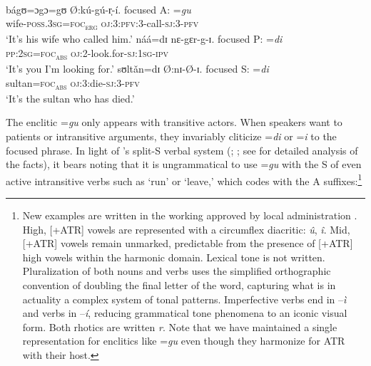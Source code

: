 \documentclass[output=paper,modfonts]{langscibook}
\begin{document}
\ea\label{ex:wolfe:1}
\ea
{}\\
     \gll bágʊ=ɔgɔ=gʊ Ø:kú-gú-r̩-í. \textup{focused A:} =\textit{gu}\\
     wife-\textsc{poss}.\textsc{3sg}=\textsc{foc}\textsc{\textsubscript{erg}} \textsc{oj}:3:\textsc{pfv}:3-call-\textsc{sj}:3-\textsc{pfv}\\
\glt ‘It’s his wife who called him.’ \citep[136]{Jakobi2006}
\ex
     \gll náá=dɪ nɛ-gɛr-g-ɪ. \textup{focused P:} =\textit{di}\\
     \textsc{pp}:\textsc{2sg}=\textsc{foc}\textsc{\textsubscript{abs}} \textsc{oj}:2-look.for-\textsc{sj}:\textsc{1sg}-\textsc{ipv}\\
\glt ‘It’s you I’m looking for.’ \citep[137]{Jakobi2006}
\ex
     \gll sʊltǎn=dɪ Ø:nɪ-Ø-ɪ. \textup{focused S:} =\textit{di}\\
     sultan=\textsc{foc}\textsc{\textsubscript{abs}} \textsc{oj}:3:die-\textsc{sj}:3-\textsc{pfv}\\
\glt ‘It’s the sultan who has died.’ \citep[137]{Jakobi2006}
\z
\z

The enclitic =\textit{gu} only appears with transitive actors. When speakers want to  patients or intransitive arguments, they invariably cliticize =\textit{di} or =\textit{i} to the focused  phrase. In light of ’s split-S verbal system (\citealt{Mithun1991}; \citealt[Chapter 4]{Dixon1994}; see \citealt{Jakobi2011} for detailed analysis of the  facts), it bears noting that it is ungrammatical to use =\textit{gu} with the S of even active intransitive verbs such as ‘run’ or ‘leave,’ which  codes with the A suffixes:\footnote{New  examples are written in the working  approved by local administration \citep{ADESK2006}. High, [+ATR] vowels are represented with a circumflex diacritic: \textit{û}, \textit{î}. Mid, [+ATR] vowels remain unmarked, predictable from the presence of [+ATR] high vowels within the harmonic domain. Lexical tone is not written. Pluralization of both nouns and verbs uses the simplified orthographic convention of doubling the final letter of the word, capturing what is in actuality a complex system of tonal patterns. Imperfective verbs end in –\textit{ì} and  verbs in –\textit{í}, reducing grammatical tone phenomena to an iconic visual form. Both rhotics are written \textit{r}. Note that we have maintained a single representation for enclitics like =\textit{gu} even though they harmonize for ATR with their host.}
\end{document}
